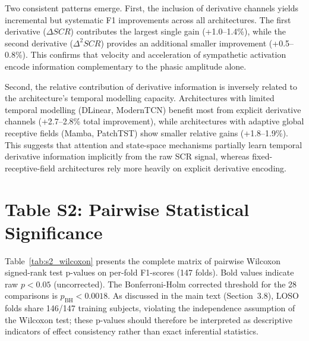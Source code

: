 \documentclass[runningheads]{llncs}
\begin{document}
Two consistent patterns emerge. First, the inclusion of derivative channels yields incremental but systematic F1 improvements across all architectures. The first derivative ($\Delta SCR$) contributes the largest single gain (+1.0--1.4\%), while the second derivative ($\Delta^2 SCR$) provides an additional smaller improvement (+0.5--0.8\%). This confirms that velocity and acceleration of sympathetic activation encode information complementary to the phasic amplitude alone.

Second, the relative contribution of derivative information is inversely related to the architecture's temporal modelling capacity. Architectures with limited temporal modelling (DLinear, ModernTCN) benefit most from explicit derivative channels (+2.7--2.8\% total improvement), while architectures with adaptive global receptive fields (Mamba, PatchTST) show smaller relative gains (+1.8--1.9\%). This suggests that attention and state-space mechanisms partially learn temporal derivative information implicitly from the raw SCR signal, whereas fixed-receptive-field architectures rely more heavily on explicit derivative encoding.

\section*{Table S2: Pairwise Statistical Significance}

Table~\ref{tab:s2_wilcoxon} presents the complete matrix of pairwise Wilcoxon signed-rank test p-values on per-fold F1-scores (147 folds). Bold values indicate raw $p < 0.05$ (uncorrected). The Bonferroni-Holm corrected threshold for the 28 comparisons is $p_{\text{BH}} < 0.0018$. As discussed in the main text (Section~3.8), LOSO folds share 146/147 training subjects, violating the independence assumption of the Wilcoxon test; these p-values should therefore be interpreted as descriptive indicators of effect consistency rather than exact inferential statistics.
\end{document}
